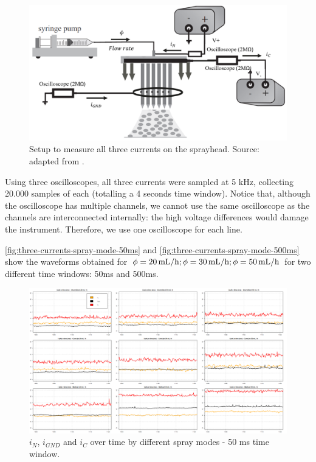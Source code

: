 \documentclass[oneside,12pt]{article}
\begin{document}
\begin{figure}[h!]
    \centering
    \includegraphics[width=.8\textwidth,trim=1 1 1 1,clip]{figures/setup-three-currents-spray-mode.png}
    \caption{Setup to measure all three currents on the sprayhead. Source: adapted from \cite{Verdoold2013}.}
    \label{fig:setup-three-currents-spray-mode}
\end{figure}

Using three oscilloscopes, all three currents were sampled at 5 kHz, collecting 20.000 samples of each
(totalling a 4 seconds time window). Notice that, although the oscilloscope has multiple channels, 
we cannot use the same oscilloscope as the channels are interconnected internally: the high voltage 
differences would damage the instrument. Therefore, we use one oscilloscope for each line. 

\autoref{fig:three-currents-spray-mode-50ms} and \autoref{fig:three-currents-spray-mode-500ms} show the waveforms 
obtained for $\phi = 20 \,\mathrm{mL/h}; \phi = 30 \,\mathrm{mL/h}; \phi = 50 \,\mathrm{mL/h}$ for two different time windows: 50ms 
and 500ms.

\begin{figure}[h!]
    \centering
    \includegraphics[width=1\textwidth,trim=1 1 1 1,clip]{figures/three-currents-spray-mode-50ms.png}
    \caption{$i_N$, $i_{GND}$ and $i_C$ over time by different spray modes - 50 ms time window.}
    \label{fig:three-currents-spray-mode-50ms}
\end{figure}
\end{document}
